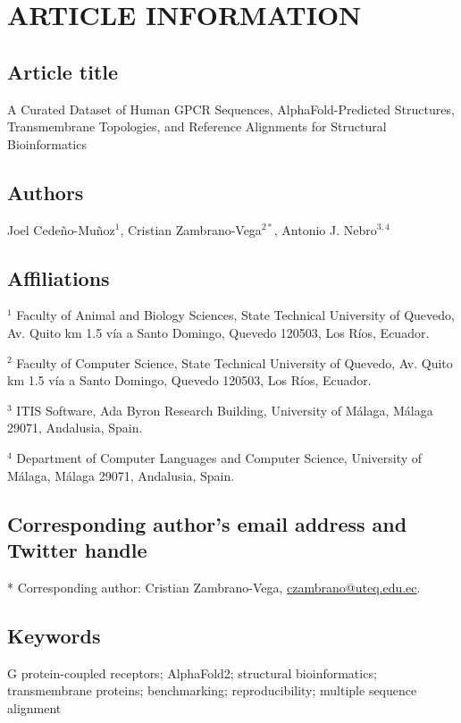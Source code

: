 \documentclass[a4paper,12pt]{article}
\begin{document}
	
	\renewcommand{\linenumberfont}{\normalfont\scriptsize}
	\linenumbers
	
	\section*{ARTICLE INFORMATION}
	
	\subsection*{Article title}
	A Curated Dataset of Human GPCR Sequences, AlphaFold-Predicted Structures, Transmembrane Topologies, and Reference Alignments for Structural Bioinformatics
	
	\subsection*{Authors}
	Joel Cede\~no-Mu\~noz$^{1}$, Cristian Zambrano-Vega$^{2*}$, Antonio J. Nebro$^{3,4}$
	
	\subsection*{Affiliations}
	$^{1}$ Faculty of Animal and Biology Sciences, State Technical University of Quevedo, Av. Quito km 1.5 v\'ia a Santo Domingo, Quevedo 120503, Los R\'ios, Ecuador.
	
	$^{2}$ Faculty of Computer Science, State Technical University of Quevedo, Av. Quito km 1.5 v\'ia a Santo Domingo, Quevedo 120503, Los R\'ios, Ecuador.
	
	$^{3}$ ITIS Software, Ada Byron Research Building, University of M\'alaga, M\'alaga 29071, Andalusia, Spain.
	
	$^{4}$ Department of Computer Languages and Computer Science, University of M\'alaga, M\'alaga 29071, Andalusia, Spain.
	
	\subsection*{Corresponding author's email address and Twitter handle}
	* Corresponding author: Cristian Zambrano-Vega, \href{mailto:czambrano@uteq.edu.ec}{czambrano@uteq.edu.ec}.
	
	\subsection*{Keywords}
	G protein-coupled receptors; AlphaFold2; structural bioinformatics; transmembrane proteins; benchmarking; reproducibility; multiple sequence alignment
	
\end{document}
